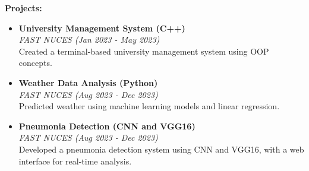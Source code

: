 \documentclass[a4paper,10pt]{article}
\begin{document}
\textbf{Projects:}
\begin{itemize}
    \item \textbf{University Management System (C++)} \\
    \textit{FAST NUCES (Jan 2023 - May 2023)}\\
    Created a terminal-based university management system using OOP concepts.

    \item \textbf{Weather Data Analysis (Python)} \\
    \textit{FAST NUCES (Aug 2023 - Dec 2023)}\\
    Predicted weather using machine learning models and linear regression.

    \item \textbf{Pneumonia Detection (CNN and VGG16)} \\
    \textit{FAST NUCES (Aug 2023 - Dec 2023)}\\
    Developed a pneumonia detection system using CNN and VGG16, with a web interface for real-time analysis.
\end{itemize}

\vspace{5pt}

\end{document}
